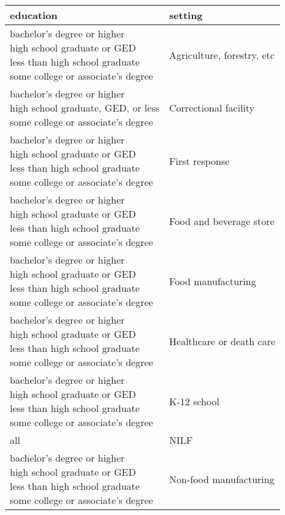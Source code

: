 \begin{table}
\centering
\begin{tabular}[t]{ll}
\toprule
education & setting\\
\midrule
\makecell[l]{bachelor's degree or higher\\high school graduate or GED\\less than high school graduate\\some college or associate's degree} & Agriculture, forestry, etc\\
\cmidrule{1-2}
\makecell[c]{bachelor's degree or higher\\high school graduate, GED, or less\\some college or associate's degree} & Correctional facility\\
\cmidrule{1-2}
\makecell[r]{bachelor's degree or higher\\high school graduate or GED\\less than high school graduate\\some college or associate's degree} & First response\\
\cmidrule{1-2}
\makecell[l]{bachelor's degree or higher\\high school graduate or GED\\less than high school graduate\\some college or associate's degree} & Food and beverage store\\
\cmidrule{1-2}
\makecell[c]{bachelor's degree or higher\\high school graduate or GED\\less than high school graduate\\some college or associate's degree} & Food manufacturing\\
\cmidrule{1-2}
\makecell[r]{bachelor's degree or higher\\high school graduate or GED\\less than high school graduate\\some college or associate's degree} & Healthcare or death care\\
\cmidrule{1-2}
\makecell[l]{bachelor's degree or higher\\high school graduate or GED\\less than high school graduate\\some college or associate's degree} & K-12 school\\
\cmidrule{1-2}
all & NILF\\
\cmidrule{1-2}
\makecell[r]{bachelor's degree or higher\\high school graduate or GED\\less than high school graduate\\some college or associate's degree} & Non-food manufacturing\\

\end{tabular}
\end{table}
